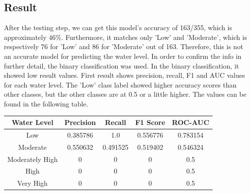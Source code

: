 \documentclass[10pt, conference, compsocconf]{IEEEtran}
\begin{document}
\subsection{Result}
After the testing step, we can get this model's accuracy of 163/355, which is approximately 46\%. Furthermore, it matches only 'Low' and 'Moderate', which is respectively 76 for 'Low' and 86 for 'Moderate' out of 163. Therefore, this is not an accurate model for predicting the water level. In order to confirm the info in further detail, the binary classification was used. In the binary classification, it showed low result values. First result shows precision, recall, F1 and AUC values for each water level. The 'Low' class label showed higher accuracy scores than other classes, but the other classes are at 0.5 or a little higher. The values can be found in the following table.
\begin{center}
 \begin{tabular}{||c c c c c||} 
 \hline
 Water Level & Precision & Recall & F1 Score & ROC-AUC \\ [0.5ex] 
 \hline\hline
 Low & 0.385786 & 1.0 & 0.556776 & 0.783154 \\ 
 \hline
 Moderate & 0.550632 & 0.491525 & 0.519402 & 0.546324 \\
 \hline
 Moderately High & 0 & 0 & 0 & 0.5 \\
 \hline
 High & 0 & 0 & 0 & 0.5 \\
 \hline
 Very High & 0 & 0 & 0 & 0.5 \\ [1ex] 
 \hline
\end{tabular}
\end{center}
\end{document}

